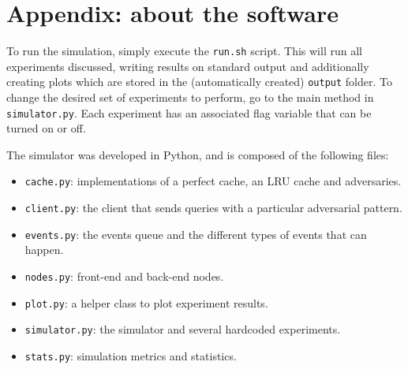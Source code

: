 \documentclass[10pt,letterpaper]{article}
\begin{document}



\section{Appendix: about the software}

To run the simulation, simply execute the \texttt{run.sh} script. This will run all experiments discussed, writing results on standard output and additionally creating plots which are stored in the (automatically created) \texttt{output} folder. To change the desired set of experiments to perform, go to the main method in \texttt{simulator.py}. Each experiment has an associated flag variable that can be turned on or off.

The simulator was developed in Python, and is composed of the following files:

\begin{itemize}
	\item \texttt{cache.py}: implementations of a perfect cache, an LRU cache and adversaries.
	\item \texttt{client.py}: the client that sends queries with a particular adversarial pattern.
	\item \texttt{events.py}: the events queue and the different types of events that can happen.
	\item \texttt{nodes.py}: front-end and back-end nodes.
	\item \texttt{plot.py}: a helper class to plot experiment results.
	\item \texttt{simulator.py}: the simulator and several hardcoded experiments.
	\item \texttt{stats.py}: simulation metrics and statistics.
\end{itemize}
\end{document}
